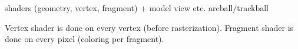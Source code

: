 shaders (geometry, vertex, fragment) + model view etc.
arcball/trackball

Vertex shader is done on every vertex (before rasterization).
Fragment shader is done on every pixel (coloring per fragment).